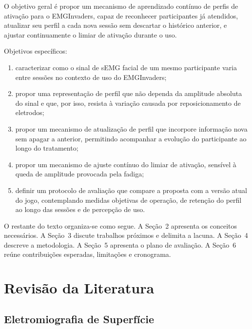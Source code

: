 O objetivo geral é propor um mecanismo de aprendizado contínuo de
perfis de ativação para o EMGInvaders, capaz de reconhecer
participantes já atendidos, atualizar seu perfil a cada nova sessão sem
descartar o histórico anterior, e ajustar continuamente o limiar de
ativação durante o uso.

Objetivos específicos:

\begin{enumerate}
    \item caracterizar como o sinal de sEMG facial de um mesmo
    participante varia entre sessões no contexto de uso do EMGInvaders;

    \item propor uma representação de perfil que não dependa da
    amplitude absoluta do sinal e que, por isso, resista à variação
    causada por reposicionamento de eletrodos;

    \item propor um mecanismo de atualização de perfil que incorpore
    informação nova sem apagar a anterior, permitindo acompanhar a
    evolução do participante ao longo do tratamento;

    \item propor um mecanismo de ajuste contínuo do limiar de ativação,
    sensível à queda de amplitude provocada pela fadiga;

    \item definir um protocolo de avaliação que compare a proposta com
    a versão atual do jogo, contemplando medidas objetivas de operação,
    de retenção do perfil ao longo das sessões e de percepção de uso.
\end{enumerate}

O restante do texto organiza-se como segue. A Seção~2 apresenta os
conceitos necessários. A Seção~3 discute trabalhos próximos e delimita
a lacuna. A Seção~4 descreve a metodologia. A Seção~5 apresenta o plano
de avaliação. A Seção~6 reúne contribuições esperadas, limitações e
cronograma.

\section{Revisão da Literatura}

\subsection{Eletromiografia de Superfície}

